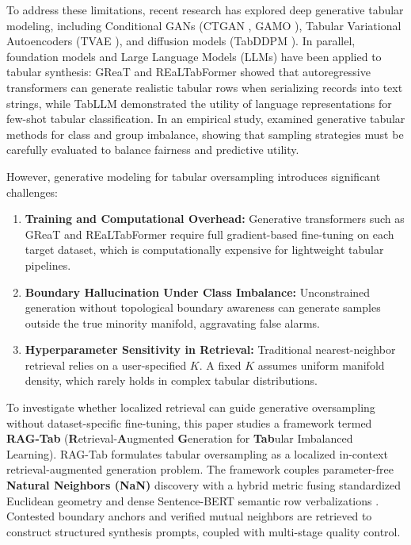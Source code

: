 \documentclass[sn-basic]{sn-jnl}
\begin{document}
To address these limitations, recent research has explored deep generative tabular modeling, including Conditional GANs (CTGAN \citep{xu2019modeling}, GAMO \citep{mullick2020generative}), Tabular Variational Autoencoders (TVAE \citep{xu2019modeling}), and diffusion models (TabDDPM \citep{kotelnikov2023tabddpm}). In parallel, foundation models and Large Language Models (LLMs) have been applied to tabular synthesis: GReaT \citep{borisov2023language} and REaLTabFormer \citep{solatorio2023realtabformer} showed that autoregressive transformers can generate realistic tabular rows when serializing records into text strings, while TabLLM \citep{hegselmann2023tabllm} demonstrated the utility of language representations for few-shot tabular classification. In an empirical study, \citet{panagiotou2024synthetic} examined generative tabular methods for class and group imbalance, showing that sampling strategies must be carefully evaluated to balance fairness and predictive utility.

However, generative modeling for tabular oversampling introduces significant challenges:
\begin{enumerate}
    \item \textbf{Training and Computational Overhead:} Generative transformers such as GReaT and REaLTabFormer require full gradient-based fine-tuning on each target dataset, which is computationally expensive for lightweight tabular pipelines.
    \item \textbf{Boundary Hallucination Under Class Imbalance:} Unconstrained generation without topological boundary awareness can generate samples outside the true minority manifold, aggravating false alarms.
    \item \textbf{Hyperparameter Sensitivity in Retrieval:} Traditional nearest-neighbor retrieval relies on a user-specified $K$. A fixed $K$ assumes uniform manifold density, which rarely holds in complex tabular distributions.
\end{enumerate}

To investigate whether localized retrieval can guide generative oversampling without dataset-specific fine-tuning, this paper studies a framework termed \textbf{RAG-Tab} (\textbf{R}etrieval-\textbf{A}ugmented \textbf{G}eneration for \textbf{Tab}ular Imbalanced Learning). RAG-Tab formulates tabular oversampling as a localized in-context retrieval-augmented generation problem. The framework couples parameter-free \textbf{Natural Neighbors (NaN)} discovery \citep{huang2011natural} with a hybrid metric fusing standardized Euclidean geometry and dense Sentence-BERT semantic row verbalizations \citep{reimers2019sentence}. Contested boundary anchors and verified mutual neighbors are retrieved to construct structured synthesis prompts, coupled with multi-stage quality control.
\end{document}
